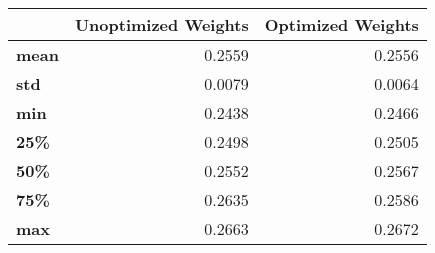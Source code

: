 \begin{tabular}{lrr}
\toprule
{} &  Unoptimized Weights &  Optimized Weights \\
\midrule
\textbf{mean} &               0.2559 &             0.2556 \\
\textbf{std } &               0.0079 &             0.0064 \\
\textbf{min } &               0.2438 &             0.2466 \\
\textbf{25\% } &               0.2498 &             0.2505 \\
\textbf{50\% } &               0.2552 &             0.2567 \\
\textbf{75\% } &               0.2635 &             0.2586 \\
\textbf{max } &               0.2663 &             0.2672 \\
\bottomrule
\end{tabular}
